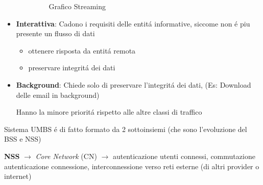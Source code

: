 \documentclass{article}
\begin{document}
\begin{samepage}
\begin{itemize}
\begin{itemize}
                    \begin{figure}[h]
                        \centering
                            \caption{Grafico Streaming}
                        \end{figure}
                \end{itemize}

            \item \textbf{Interattiva}: Cadono i requisiti delle entit\'a informative, siccome non \'e piu presente un flusso di dati
                \begin{itemize}
                    \item ottenere risposta da entit\'a remota
                    \item preservare integrit\'a dei dati
                \end{itemize}

        \item \textbf{Background}: Chiede solo di preservare l'integrit\'a dei dati, (Es: Download delle email in background)

            Hanno la minore priorit\'a rispetto alle altre classi di traffico

    \end{itemize}
\end{samepage}
Sistema UMBS \'e di fatto formato da 2 sottoinsiemi (che sono l'evoluzione del BSS e NSS)

\textbf{NSS} $\rightarrow$ \textit{Core Network} (CN) $\rightarrow$ autenticazione utenti connessi, commutazione autenticazione connessione, interconnessione verso reti esterne (di altri provider o internet)
\end{document}
